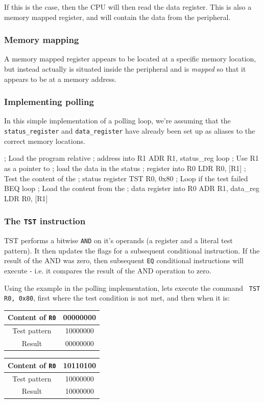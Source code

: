 If this is the case, then the CPU will then read the data register. This is also
a memory mapped register, and will contain the data from the peripheral.

\subsubsection{Memory mapping}
A memory mapped register appears to be located at a specific memory location,
but instead actually is situated inside the peripheral and is {\it mapped} so
that it appears to be at a memory address.

\subsubsection{Implementing polling}

In this simple implementation of a polling loop, we're assuming that the {\tt
status\_register} and {\tt data\_register} have already been set up as aliases to
the correct memory locations.

\begin{listing}{1}
	; Load the program relative
	; address into R1
	ADR	R1, status_reg
loop
	; Use R1 as a pointer to
	; load the data in the status
	; register into R0
	LDR	R0, [R1]
	; Test the content of the
	; status register
	TST	R0, 0x80
	; Loop if the test failed
	BEQ	loop
	; Load the content from the
	; data register into R0
	ADR	R1, data_reg
	LDR	R0, [R1]
\end{listing}

\subsubsection{The {\tt TST} instruction}

TST performs a bitwise {\tt AND} on it's operands (a register and a literal test
pattern). It then updates the flags for a subsequent conditional instruction. If
the result of the AND was zero, then subsequent {\tt EQ} conditional
instructions will execute - i.e. it compares the result of the AND operation to
zero.

Using the example in the polling implementation, lets execute the command {\tt
TST R0, 0x80}, first where the test condition is not met, and then when it is:

\begin{center}
	\begin{tabular}{c|c}
		Content of {\tt R0} & 00000000\\ \hline
		Test pattern & 10000000\\ \hline
		Result & 00000000\\ \hline
	\end{tabular}

	\begin{tabular}{c|c}
		Content of {\tt R0} & 10110100\\ \hline
		Test pattern & 10000000\\ \hline
		Result & 10000000\\ \hline
	\end{tabular}
\end{center}


